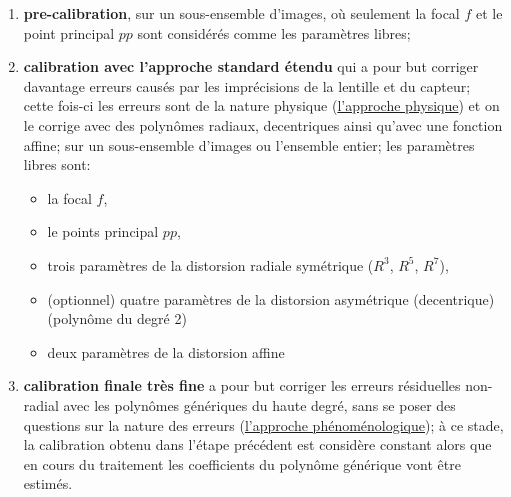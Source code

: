 \documentclass[11pt,a4paper,oneside]{book}
\begin{document}
\begin{enumerate}
\item \textbf{pre-calibration}, sur un sous-ensemble d'images, où seulement la focal $f$ et le point principal $pp$ sont considérés comme les paramètres libres;
\item \textbf{calibration avec l'approche standard étendu} qui a pour but corriger davantage erreurs causés par les imprécisions de la lentille et du capteur; cette fois-ci les erreurs sont {de la nature physique} (\underline{l’approche physique}) et on le corrige avec des polynômes radiaux, decentriques ainsi qu'avec une fonction affine; sur un sous-ensemble d'images ou l'ensemble entier; les paramètres libres sont:
	\begin{itemize}
	\item la focal $f$,
	\item le points principal $pp$,
	\item trois paramètres de la distorsion radiale symétrique ($R^3$, $R^5$, $R^7$),
	\item (optionnel) quatre paramètres de la distorsion asymétrique (decentrique) (polynôme du degré 2)
	\item deux paramètres de la distorsion affine 
	\end{itemize}
\item \textbf{calibration finale très fine} a pour but corriger les erreurs résiduelles non-radial avec les polynômes génériques du haute degré, sans se poser des questions sur la nature des erreurs (\underline{l’approche phénoménologique}); à ce stade, la calibration obtenu dans l'étape précédent est considère constant alors que en cours du traitement les coefficients du polynôme générique vont être estimés.
\end{enumerate}


\end{document}
